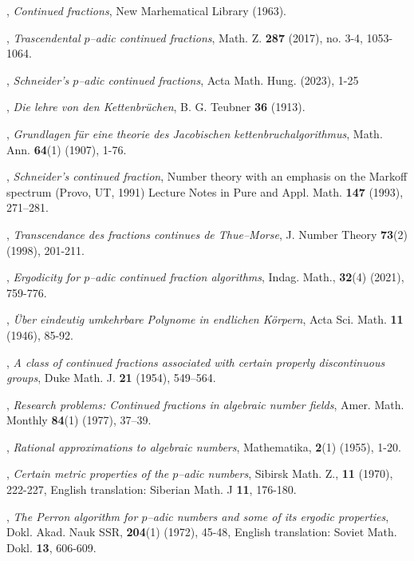 \documentclass[12pt, reqno]{amsart}
\theoremstyle{plain}
\theoremstyle{definition}
\begin{document}
\begin{thebibliography}{}
,
\textit{Continued fractions},
\newblock New Marhematical Library (1963).

,
\textit{Trascendental $p$--adic continued fractions}, 
\newblock Math. Z. \textbf{287} (2017), no. 3-4, 1053-1064.

,
\textit{Schneider’s $p$--adic continued fractions},
\newblock Acta Math. Hung. (2023), 1-25
 
,
\textit{Die lehre von den Kettenbrüchen}, 
\newblock B. G. Teubner \textbf{36} (1913).

,
\textit{Grundlagen für eine theorie des Jacobischen kettenbruchalgorithmus}, 
\newblock Math. Ann. \textbf{64}(1) (1907), 1-76.

,
\textit{Schneider’s continued fraction}, 
\newblock Number theory with an emphasis on the Markoff spectrum (Provo, UT, 1991) Lecture Notes in Pure and Appl. Math. \textbf{147} (1993), 271–281.

,
\textit{Transcendance des fractions continues de Thue–Morse}, 
\newblock J. Number Theory \textbf{73}(2) (1998), 201-211.

,
\textit{Ergodicity for $p$--adic continued fraction algorithms},
\newblock Indag. Math., \textbf{32}(4) (2021), 759-776.

,
\textit{Über eindeutig umkehrbare Polynome in endlichen Körpern},
\newblock Acta Sci. Math. \textbf{11} (1946), 85-92.


,
\textit{A class of continued fractions associated with certain properly discontinuous groups},
\newblock Duke Math. J. \textbf{21} (1954), 549–564.

,
\textit{Research problems: Continued fractions in algebraic number fields},
\newblock Amer. Math. Monthly \textbf{84}(1) (1977), 37–39.

,
\textit{Rational approximations to algebraic numbers},
\newblock Mathematika, \textbf{2}(1) (1955), 1-20.

,
\textit{Certain metric properties of the $p$--adic numbers},
\newblock Sibirsk Math. Z., \textbf{11} (1970), 222-227, English translation: Siberian Math. J \textbf{11}, 176-180.

,
\textit{The Perron algorithm for $p$--adic
numbers and some of its ergodic properties},
\newblock Dokl. Akad. Nauk SSR, \textbf{204}(1) (1972), 45-48, English translation: Soviet Math. Dokl. \textbf{13}, 606-609.


\end{thebibliography}
\end{document}
